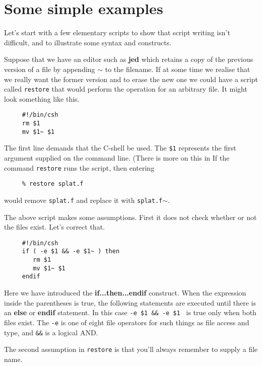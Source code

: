 \newpage
\section{Some simple examples\label{sc4_se_simple}}

Let's start with a few elementary scripts to show that script writing
isn't difficult, and to illustrate some syntax and constructs.

Suppose that we have an editor such as {\bf jed} which retains a copy
of the previous version of a file by appending {\tt $\sim$} to the
filename.  If at some time we realise that we really want the former
version and to erase the new one we could have a script called
{\tt restore} that would perform the operation for an arbitrary file.
It might look something like this.

\small
\begin{verbatim}
     #!/bin/csh
     rm $1
     mv $1~ $1
\end{verbatim}
\normalsize
The first line demands that the C-shell be used.
The {\tt \$1} represents the first argument supplied on the command line.
(There is more on this in 
If the command {\tt restore} runs the script, then entering

\small
\begin{verbatim}
     % restore splat.f
\end{verbatim}
\normalsize
would remove {\tt splat.f} and replace it with {\tt splat.f$\sim$}.

The above script makes some assumptions.  First it does not check
whether or not the files exist.  Let's correct that.

\small
\begin{verbatim}
     #!/bin/csh
     if ( -e $1 && -e $1~ ) then
        rm $1
        mv $1~ $1
     endif
\end{verbatim}
\normalsize

Here we have introduced the {\bf if...then...endif} construct.  When
the expression inside the parentheses is true, the following statements
are executed until there is an {\bf else} or {\bf endif} statement.
In this case {\tt -e \$1 \&\& -e \$1~} is true only when both files exist.
The {\tt -e} is one of eight {\sf file operators} for such things as
file access and type, and {\tt \&\&} is a logical AND.

The second assumption in {\tt restore} is that you'll always remember
to supply a file name.


